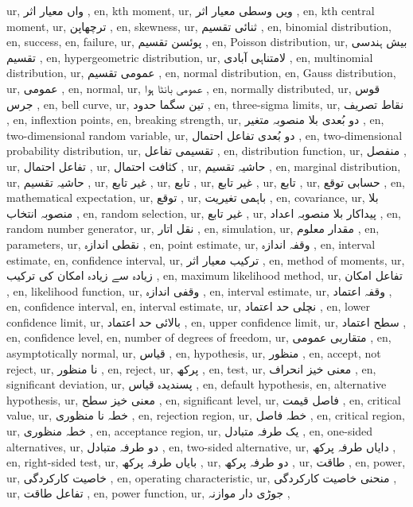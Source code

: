 ur,  واں معیار اثر ,
en, kth moment,
ur,  ویں وسطی معیار اثر ,
en, kth central moment,
ur, ترچھاپن ,
en, skewness,
ur, ثنائی تقسیم ,
en, binomial distribution,
en, success,
en, failure,
ur, پوئسن تقسیم ,
en, Poisson distribution,
ur, بیش ہندسی تقسیم ,
en, hypergeometric distribution,
ur, لامتناہی آبادی ,
en, multinomial distribution,
ur, عمومی تقسیم ,
en, normal distribution,
en, Gauss distribution,
ur, عمومی ,
en, normal,
ur, عمومی بانٹا ہوا ,
en, normally distributed,
ur, قوس جرس ,
en, bell curve,
ur, تین سگما حدود ,
en, three-sigma limits,
ur, نقاط تصریف ,
en, inflextion points,
en, breaking strength,
ur, دو بُعدی بلا منصوبہ متغیر ,
en, two-dimensional random variable,
ur, دو بُعدی تفاعل احتمال ,
en, two-dimensional probability distribution,
ur, تقسیمی تفاعل ,
en, distribution function,
ur, منفصل ,
ur, تفاعل احتمال ,
ur, کثافت احتمال ,
ur, حاشیہ تقسیم ,
en, marginal distribution,
ur, حاشیہ تقسیم ,
ur, غیر تابع ,
ur, تابع ,
ur, غیر تابع ,
ur, تابع ,
ur, حسابی توقع ,
en, mathematical expectation,
ur, توقع ,
ur, باہمی تغیریت ,
en, covariance,
ur, بلا منصوبہ انتخاب ,
en, random selection,
ur, غیر تابع ,
ur, پیداکار بلا منصوبہ اعداد ,
en, random number generator,
ur, نقل اتار ,
en, simulation,
ur, مقدار معلوم ,
en, parameters,
ur, نقطی اندازہ ,
en, point estimate,
ur, وقفہ اندازہ ,
en, interval estimate,
en, confidence interval,
ur, ترکیب معیار اثر ,
en, method of moments,
ur, زیادہ سے زیادہ امکان کی ترکیب ,
en, maximum likelihood method,
ur, تفاعل امکان ,
en, likelihood function,
ur, وقفی اندازہ ,
en, interval estimate,
ur, وقفہ اعتماد ,
en, confidence interval,
en, interval estimate,
ur, نچلی حد اعتماد ,
en, lower confidence limit,
ur, بالائی حد اعتماد ,
en, upper confidence limit,
ur, سطح اعتماد ,
en, confidence level,
en, number of degrees of freedom,
ur, متقاربی عمومی ,
en, asymptotically normal,
ur, قیاس ,
en, hypothesis,
ur, منظور ,
en, accept, not reject,
ur, نا منظور ,
en, reject,
ur, پرکھ ,
en, test,
ur, معنی خیز انحراف ,
en, significant deviation,
ur, پسندیدہ قیاس ,
en, default hypothesis,
en, alternative hypothesis,
ur, معنی خیز سطح ,
en, significant level,
ur, فاصل قیمت ,
en, critical value,
ur, خطہ نا منظوری ,
en, rejection region,
ur, خطہ فاصل ,
en, critical region,
ur, خطہ منظوری ,
en, acceptance region,
ur, یک طرفہ متبادل ,
en, one-sided alternatives,
ur, دو طرفہ متبادل ,
en, two-sided alternative,
ur, دایاں طرفہ پرکھ ,
en, right-sided test,
ur, بایاں طرفہ پرکھ ,
ur, دو طرفہ پرکھ ,
ur, طاقت ,
en, power,
ur, خاصیت کارکردگی ,
en, operating characteristic,
ur, منحنی خاصیت کارکردگی ,
ur, تفاعل طاقت ,
en, power function,
ur, جوڑی دار موازنہ ,
